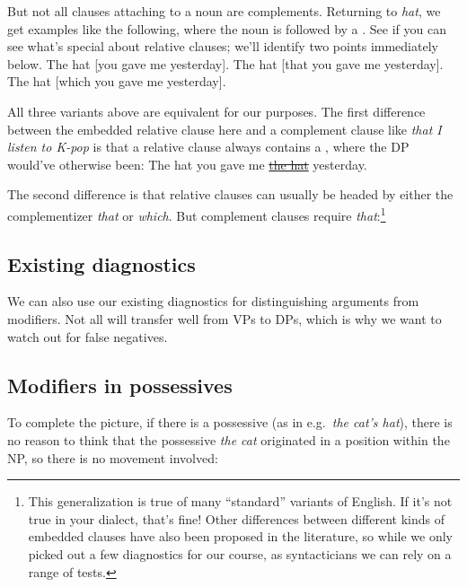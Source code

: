 \documentclass{article}
\begin{document}
But not all clauses attaching to a noun are complements. Returning to \emph{hat}, we get examples like the following, where the noun is followed by a . See if you can see what's special about relative clauses; we'll identify two points immediately below.
\ea
    \ea The hat [you gave me yesterday].
    \ex The hat [that you gave me yesterday].
    \ex The hat [which you gave me yesterday].
    \z
\z

All three variants above are equivalent for our purposes. The first difference between the embedded relative clause here and a complement clause like \emph{that I listen to K-pop} is that a relative clause always contains a , where the DP would've otherwise been:
\ea The hat you gave me \uline{\sout{the hat}} yesterday.
\z

The second difference is that relative clauses can usually be headed by either the complementizer \emph{that} or \emph{which}. But complement clauses require \emph{that}:\footnote{This generalization is true of many ``standard'' variants of English. If it's not true in your dialect, that's fine! Other differences between different kinds of embedded clauses have also been proposed in the literature, so while we only picked out a few diagnostics for our course, as syntacticians we can rely on a range of tests.}
\z

    \subsection{Existing diagnostics}
We can also use our existing diagnostics for distinguishing arguments from modifiers. Not all will transfer well from VPs to DPs, which is why we want to watch out for false negatives.

    \subsection{Modifiers in possessives}
To complete the picture, if there is a possessive (as in e.g.\ \emph{the cat's hat}), there is no reason to think that the possessive \emph{the cat} originated in a position within the NP, so there is no movement involved:
\begin{exe}
\end{exe}
\end{document}
